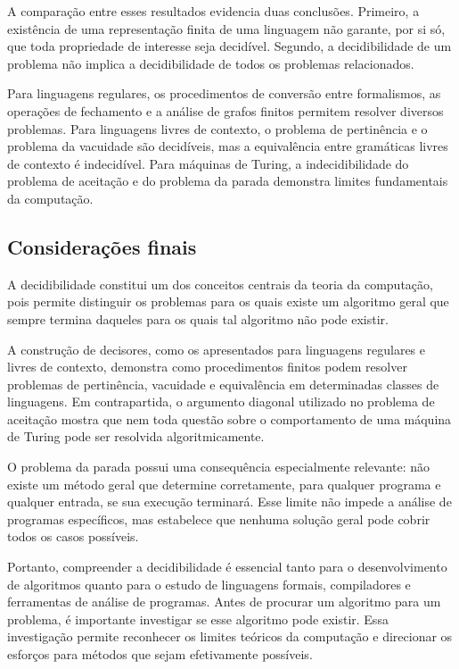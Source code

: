 \documentclass[
  brazilian,
  letterpaper,
]{book}
\theoremstyle{plain}
\theoremstyle{definition}
\theoremstyle{remark}
\begin{document}
A comparação entre esses resultados evidencia duas conclusões. Primeiro,
a existência de uma representação finita de uma linguagem não garante,
por si só, que toda propriedade de interesse seja decidível. Segundo, a
decidibilidade de um problema não implica a decidibilidade de todos os
problemas relacionados.

Para linguagens regulares, os procedimentos de conversão entre
formalismos, as operações de fechamento e a análise de grafos finitos
permitem resolver diversos problemas. Para linguagens livres de
contexto, o problema de pertinência e o problema da vacuidade são
decidíveis, mas a equivalência entre gramáticas livres de contexto é
indecidível. Para máquinas de Turing, a indecidibilidade do problema de
aceitação e do problema da parada demonstra limites fundamentais da
computação.

\subsection{Considerações finais}\label{considerauxe7uxf5es-finais}

A decidibilidade constitui um dos conceitos centrais da teoria da
computação, pois permite distinguir os problemas para os quais existe um
algoritmo geral que sempre termina daqueles para os quais tal algoritmo
não pode existir.

A construção de decisores, como os apresentados para linguagens
regulares e livres de contexto, demonstra como procedimentos finitos
podem resolver problemas de pertinência, vacuidade e equivalência em
determinadas classes de linguagens. Em contrapartida, o argumento
diagonal utilizado no problema de aceitação mostra que nem toda questão
sobre o comportamento de uma máquina de Turing pode ser resolvida
algoritmicamente.

O problema da parada possui uma consequência especialmente relevante:
não existe um método geral que determine corretamente, para qualquer
programa e qualquer entrada, se sua execução terminará. Esse limite não
impede a análise de programas específicos, mas estabelece que nenhuma
solução geral pode cobrir todos os casos possíveis.

Portanto, compreender a decidibilidade é essencial tanto para o
desenvolvimento de algoritmos quanto para o estudo de linguagens
formais, compiladores e ferramentas de análise de programas. Antes de
procurar um algoritmo para um problema, é importante investigar se esse
algoritmo pode existir. Essa investigação permite reconhecer os limites
teóricos da computação e direcionar os esforços para métodos que sejam
efetivamente possíveis.
\end{document}
